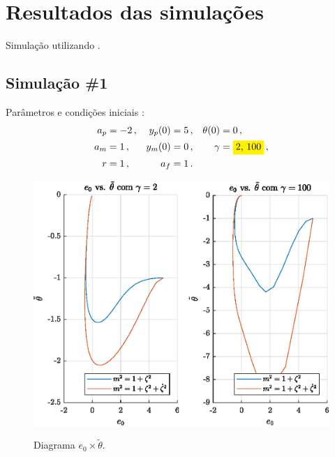 ﻿%
\section{Resultados das simulações}

Simulação utilizando .

\subsection{Simulação \#1}

\bigskip%
Parâmetros e condições iniciais  :
%
\begin{align*}
  a_p &= -2\,,  &  y_p(0) &= 5\,, & \theta(0) &= 0\,, \\
  a_m &= 1\,,   &  y_m(0) &= 0\,, & \gamma &= \HI{2, 100}\,, \\
  r &= 1\,, & a_f &= 1\,.
\end{align*}

\bigskip%
\begin{figure}[H]
  \centering
  \includegraphics[width=12cm]{figs/e0_vs_deltatheta/gamma2gamma100.eps} \\[2mm]
  \caption{Diagrama $e_0 \times \tilde{\theta}$.}
\end{figure}

